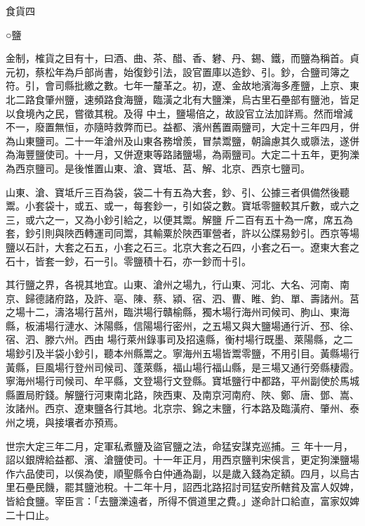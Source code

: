 
\begin{pinyinscope}

 食貨四



 ○鹽



 金制，榷貨之目有十，曰酒、曲、茶、醋、香、礬、丹、錫、鐵，而鹽為稱首。貞元初，蔡松年為戶部尚書，始復鈔引法，設官置庫以造鈔、引。鈔，合鹽司簿之符。引，會司縣批繳之數。七年一釐革之。初，遼、金故地濱海多產鹽，上京、東北二路食肇州鹽，速頻路食海鹽，臨潢之北有大鹽濼，烏古里石壘部有鹽池，皆足以食境內之民，嘗徵其稅。及得
 中土，鹽場倍之，故設官立法加詳焉。然而增減不一，廢置無恒，亦隨時救弊而已。益都、濱州舊置兩鹽司，大定十三年四月，併為山東鹽司。二十一年滄州及山東各務增羨，冒禁鬻鹽，朝論慮其久或隳法，遂併為海豐鹽使司。十一月，又併遼東等路諸鹽場，為兩鹽司。大定二十五年，更狗濼為西京鹽司。是後惟置山東、滄、寶坻、莒、解、北京、西京七鹽司。



 山東、滄、寶坻斤三百為袋，袋二十有五為大套，鈔、引、公據三者俱備然後聽鬻。小套袋十，或五、或一，每套鈔一，引如袋之數。寶坻零鹽較其斤數，或六之三，或六之一，又為小鈔引給之，以便其鬻。解鹽
 斤二百有五十為一席，席五為套，鈔引則與陜西轉運司同鬻，其輸粟於陜西軍營者，許以公牒易鈔引。西京等場鹽以石計，大套之石五，小套之石三。北京大套之石四，小套之石一。遼東大套之石十，皆套一鈔，石一引。零鹽積十石，亦一鈔而十引。



 其行鹽之界，各視其地宜。山東、滄州之場九，行山東、河北、大名、河南、南京、歸德諸府路，及許、亳、陳、蔡、潁、宿、泗、曹、睢、鈞、單、壽諸州。莒之場十二，濤洛場行莒州，臨洪場行贛榆縣，獨木場行海州司候司、朐山、東海縣，板浦場行漣水、沐陽縣，信陽場行密州，之五場又與大鹽場通行沂、邳、徐、宿、泗、滕六州。西由
 場行萊州錄事司及招遠縣，衡村場行既墨、萊陽縣，之二場鈔引及半袋小鈔引，聽本州縣鬻之。寧海州五場皆鬻零鹽，不用引目。黃縣場行黃縣，巨風場行登州司候司、蓬萊縣，福山場行福山縣，是三場又通行旁縣棲霞。寧海州場行司候司、牟平縣，文登場行文登縣。寶坻鹽行中都路，平州副使於馬城縣置局貯錢。解鹽行河東南北路，陜西東、及南京河南府、陜、鄭、唐、鄧、嵩、汝諸州。西京、遼東鹽各行其地。北京宗、錦之末鹽，行本路及臨潢府、肇州、泰州之境，與接壤者亦預焉。



 世宗大定三年二月，定軍私煮鹽及盜官鹽之法，命猛安謀克巡捕。三
 年十一月，詔以銀牌給益都、濱、滄鹽使司。十一年正月，用西京鹽判宋俁言，更定狗濼鹽場作六品使司，以俁為使，順聖縣令白仲通為副，以是歲入錢為定額。四月，以烏古里石壘民饑，罷其鹽池稅。十二年十月，詔西北路招討司猛安所轄貧及富人奴婢，皆給食鹽。宰臣言：「去鹽濼遠者，所得不償道里之費。」遂命計口給直，富家奴婢二十口止。




\end{pinyinscope}
